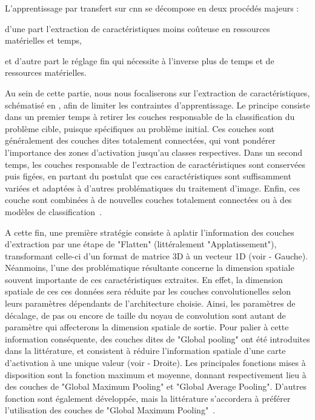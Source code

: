 L'apprentissage par transfert sur \gls{cnn} se décompose en deux procédés majeurs : 
\begin{inlinerate}
    \item d'une part l'extraction de caractéristiques moins coûteuse en ressources matérielles et temps,
    \item et d'autre part le réglage fin qui nécessite à l'inverse plus de temps et de ressources matérielles. 
\end{inlinerate}
Au sein de cette partie, nous nous focaliserons sur l'extraction de caractéristiques, schématisé en , afin de limiter les contraintes d'apprentissage. Le principe consiste dans un premier temps à retirer les couches responsable de la classification du problème cible, puisque spécifiques au problème initial. Ces couches sont généralement des couches dites totalement connectées, qui vont pondérer l'importance des zones d'activation jusqu'au classes respectives. Dans un second temps, les couches responsable de l'extraction de caractéristiques sont conservées puis figées, en partant du postulat que ces caractéristiques sont suffisamment variées et adaptées à d'autres problématiques du traitement d'image. Enfin, ces couche sont combinées à de nouvelles couches totalement connectées ou à des modèles de classification~\cite{Litjens2017}.\par 

A cette fin, une première stratégie consiste à aplatir l'information des couches d'extraction par une étape de "Flatten" (littéralement "Applatissement"), transformant celle-ci d'un format de matrice 3D à un vecteur 1D (voir  - Gauche). Néanmoins, l'une des problématique résultante concerne la dimension spatiale souvent importante de ces caractéristiques extraites. En effet, la dimension spatiale de ces ces données sera réduite par les couches convolutionelles selon leurs paramètres dépendants de l'architecture choisie. Ainsi, les paramètres de décalage, de pas ou encore de taille du noyau de convolution sont autant de paramètre qui affecterons la dimension spatiale de sortie. Pour palier à cette information conséquente, des couches dites de "Global pooling" ont été introduites dans la littérature, et consistent à réduire l'information spatiale d'une carte d'activation à une unique valeur (voir  - Droite). Les principales fonctions mises à disposition sont la fonction maximum et moyenne, donnant respectivement lieu à des couches de "Global Maximum Pooling" et "Global Average Pooling". D'autres fonction sont également développée, mais la littérature s'accordera à préférer l'utilisation des couches de "Global Maximum Pooling"~\cite{christlein2019}.\par

